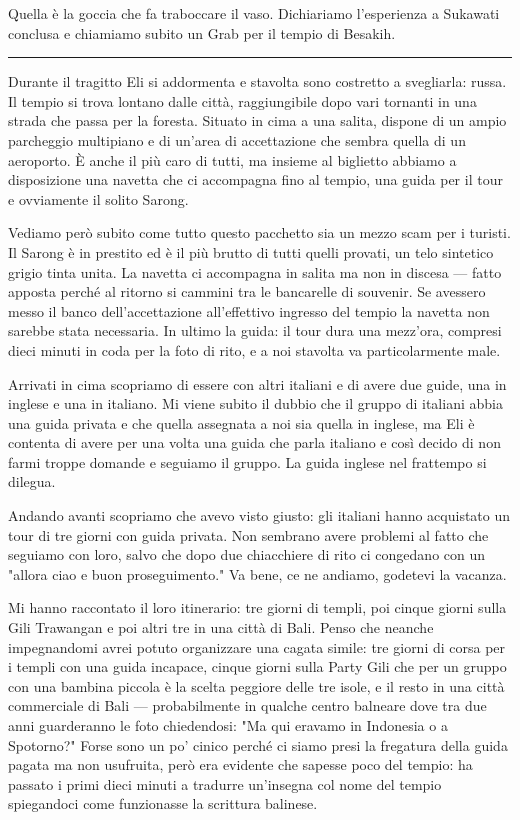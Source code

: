 Quella è la goccia che fa traboccare il vaso. Dichiariamo l'esperienza a Sukawati conclusa e chiamiamo subito un Grab per il tempio di Besakih.

\begin{center}
    \noindent\rule{0.6\textwidth}{0.4pt}
\end{center}

Durante il tragitto Eli si addormenta e stavolta sono costretto a svegliarla: russa. Il tempio si trova lontano dalle città, raggiungibile dopo vari tornanti in una strada che passa per la foresta. Situato in cima a una salita, dispone di un ampio parcheggio multipiano e di un'area di accettazione che sembra quella di un aeroporto. È anche il più caro di tutti, ma insieme al biglietto abbiamo a disposizione una navetta che ci accompagna fino al tempio, una guida per il tour e ovviamente il solito Sarong.

Vediamo però subito come tutto questo pacchetto sia un mezzo scam per i turisti. Il Sarong è in prestito ed è il più brutto di tutti quelli provati, un telo sintetico grigio tinta unita. La navetta ci accompagna in salita ma non in discesa — fatto apposta perché al ritorno si cammini tra le bancarelle di souvenir. Se avessero messo il banco dell'accettazione all'effettivo ingresso del tempio la navetta non sarebbe stata necessaria. In ultimo la guida: il tour dura una mezz'ora, compresi dieci minuti in coda per la foto di rito, e a noi stavolta va particolarmente male.

Arrivati in cima scopriamo di essere con altri italiani e di avere due guide, una in inglese e una in italiano. Mi viene subito il dubbio che il gruppo di italiani abbia una guida privata e che quella assegnata a noi sia quella in inglese, ma Eli è contenta di avere per una volta una guida che parla italiano e così decido di non farmi troppe domande e seguiamo il gruppo. La guida inglese nel frattempo si dilegua.

Andando avanti scopriamo che avevo visto giusto: gli italiani hanno acquistato un tour di tre giorni con guida privata. Non sembrano avere problemi al fatto che seguiamo con loro, salvo che dopo due chiacchiere di rito ci congedano con un "allora ciao e buon proseguimento." Va bene, ce ne andiamo, godetevi la vacanza.

Mi hanno raccontato il loro itinerario: tre giorni di templi, poi cinque giorni sulla Gili Trawangan e poi altri tre in una città di Bali. Penso che neanche impegnandomi avrei potuto organizzare una cagata simile: tre giorni di corsa per i templi con una guida incapace, cinque giorni sulla Party Gili che per un gruppo con una bambina piccola è la scelta peggiore delle tre isole, e il resto in una città commerciale di Bali — probabilmente in qualche centro balneare dove tra due anni guarderanno le foto chiedendosi: "Ma qui eravamo in Indonesia o a Spotorno?" Forse sono un po' cinico perché ci siamo presi la fregatura della guida pagata ma non usufruita, però era evidente che sapesse poco del tempio: ha passato i primi dieci minuti a tradurre un'insegna col nome del tempio spiegandoci come funzionasse la scrittura balinese.

